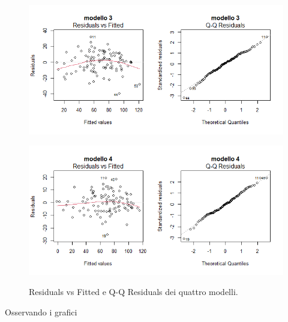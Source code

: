 \begin{figure}[H]
	\centering
	\includegraphics[width=1\linewidth]{../graphs/diagnostica/diagnostica_stepwise}

	\label{fig:diagnosticaridotto}
\end{figure}
\begin{figure}[H]
	\centering
	\includegraphics[width=1\linewidth]{../graphs/diagnostica/diagnostica_stepwise_iterations}
	\label{fig:diagnosticaridotto}
	\caption{Residuals vs Fitted e Q-Q Residuals dei quattro modelli.}
\end{figure}
Osservando i grafici 


